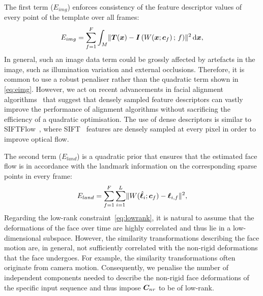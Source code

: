 The first term ($E_{img}$) enforces consistency of the feature descriptor values
of every point of the template over all frames:
\begin{equation}\label{eq:eimg}
    E_{img} = \sum_{f=1}^F \int_M  \lVert{} 
                \boldsymbol{T}(\boldsymbol{x}) -
               \boldsymbol{I}\left( W(\boldsymbol{x};\boldsymbol{c}_f) \,;\, f \right)
              \rVert^2  \, \mathrm{d} \boldsymbol{x},
\end{equation}
In general, such an image data term could be grossly affected by artefacts in the 
image, such as illumination variation and external occlusions. Therefore, it is
common to use a robust penaliser rather than the quadratic term shown in 
\cref{eq:eimg}. However, we act on recent advancements in facial alignment 
algorithms~\cite{antonakos2015feature} that suggest that densely 
sampled feature descriptors can vastly improve the performance of alignment
algorithms without sacrificing the efficiency of a quadratic optimisation.
The use of dense descriptors is similar to SIFTFlow~\cite{liu2011sift}, where 
SIFT~\cite{lowe2004distinctive} features are densely sampled at every pixel in order
to improve optical flow.

The second term ($E_{land}$) is a quadratic prior that ensures that the estimated
face flow is in accordance with the landmark information on the corresponding
sparse points in every frame:
\begin{equation}
    E_{land} = \sum_{f=1}^F \sum_{i=1}^L \lVert{} 
                    W(\hat{\boldsymbol{\ell}}_i;\boldsymbol{c}_f) - \boldsymbol{\ell}_{i,f}
                 \rVert^2,
\end{equation}
Regarding the low-rank constraint~\cref{eq:lowrank}, it is natural to assume that the deformations
of the face over time are highly correlated and thus lie in a low-dimensional subspace.
However, the similarity transformations describing the face motion are, in general, not 
sufficiently correlated with the non-rigid deformations that the face undergoes. For example,
the similarity transformations often originate from camera motion. Consequently, we penalise the number of 
independent components needed to describe the non-rigid face deformations of the specific input 
sequence and thus impose $\boldsymbol{C}_{nr}$ to be of low-rank.

